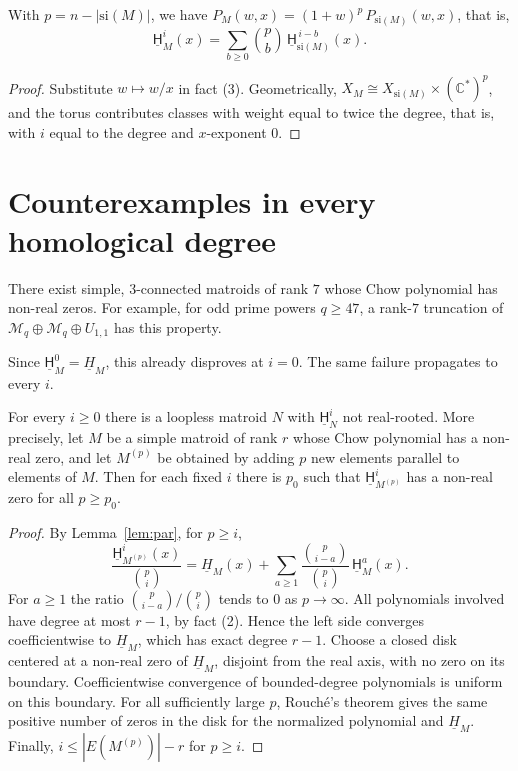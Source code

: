 \documentclass[a4paper,envcountsame,runningheads]{llncs}
\newcommand{\uH}{\underline{\mathsf H}}
\newcommand{\si}{\mathrm{si}}
\begin{document}
\begin{lemma}\label{lem:par}
With $p=n-|\si(M)|$, we have $P_M(w,x)=(1+w)^p\,P_{\si(M)}(w,x)$, that is,
\[
\uH^i_M(x)=\sum_{b\ge0}\binom pb\,\uH^{\,i-b}_{\si(M)}(x).
\]
\end{lemma}
\begin{proof}
Substitute $w\mapsto w/x$ in fact (3). Geometrically, $X_M\cong X_{\si(M)}\times(\mathbb C^*)^p$, and the torus contributes classes with weight equal to twice the degree, that is, with $i$ equal to the degree and $x$-exponent $0$.
\end{proof}

\section{Counterexamples in every homological degree}

\begin{theorem}\label{thm:bcel}
There exist simple, $3$-connected matroids of rank $7$ whose Chow polynomial has non-real zeros. For example, for odd prime powers $q\ge 47$, a rank-$7$ truncation of $\mathcal M_q\oplus\mathcal M_q\oplus U_{1,1}$ has this property.
\end{theorem}

Since $\uH^0_M=\underline H_M$, this already disproves \cite[Conj.~1.5]{BV} at $i=0$. The same failure propagates to every $i$.

\begin{theorem}\label{thm:main}
For every $i\ge 0$ there is a loopless matroid $N$ with $\uH^i_N$ not real-rooted. More precisely, let $M$ be a simple matroid of rank $r$ whose Chow polynomial has a non-real zero, and let $M^{(p)}$ be obtained by adding $p$ new elements parallel to elements of $M$. Then for each fixed $i$ there is $p_0$ such that $\uH^i_{M^{(p)}}$ has a non-real zero for all $p\ge p_0$.
\end{theorem}
\begin{proof}
By Lemma~\ref{lem:par}, for $p\ge i$,
\[
\frac{\uH^i_{M^{(p)}}(x)}{\binom pi}=\underline H_M(x)+\sum_{a\ge1}\frac{\binom p{i-a}}{\binom pi}\,\uH^a_M(x).
\]
For $a\ge1$ the ratio $\binom p{i-a}/\binom pi$ tends to $0$ as $p\to\infty$. All polynomials involved have degree at most $r-1$, by fact (2). Hence the left side converges coefficientwise to $\underline H_M$, which has exact degree $r-1$. Choose a closed disk centered at a non-real zero of $\underline H_M$, disjoint from the real axis, with no zero on its boundary. Coefficientwise convergence of bounded-degree polynomials is uniform on this boundary. For all sufficiently large $p$, Rouch\'e's theorem gives the same positive number of zeros in the disk for the normalized polynomial and $\underline H_M$. Finally, $i\le |E(M^{(p)})|-r$ for $p\ge i$.
\end{proof}
\end{document}
